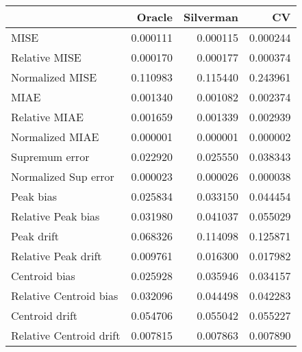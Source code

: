 \begin{tabular}{lrrr}
  \toprule
 & Oracle & Silverman & CV \\ 
  \midrule
MISE & 0.000111 & 0.000115 & 0.000244 \\ 
  Relative MISE & 0.000170 & 0.000177 & 0.000374 \\ 
  Normalized MISE & 0.110983 & 0.115440 & 0.243961 \\ 
  MIAE & 0.001340 & 0.001082 & 0.002374 \\ 
  Relative MIAE & 0.001659 & 0.001339 & 0.002939 \\ 
  Normalized MIAE & 0.000001 & 0.000001 & 0.000002 \\ 
  Supremum error & 0.022920 & 0.025550 & 0.038343 \\ 
  Normalized Sup error & 0.000023 & 0.000026 & 0.000038 \\ 
  Peak bias & 0.025834 & 0.033150 & 0.044454 \\ 
  Relative Peak bias & 0.031980 & 0.041037 & 0.055029 \\ 
  Peak drift & 0.068326 & 0.114098 & 0.125871 \\ 
  Relative Peak drift & 0.009761 & 0.016300 & 0.017982 \\ 
  Centroid bias & 0.025928 & 0.035946 & 0.034157 \\ 
  Relative Centroid bias & 0.032096 & 0.044498 & 0.042283 \\ 
  Centroid drift & 0.054706 & 0.055042 & 0.055227 \\ 
  Relative Centroid drift & 0.007815 & 0.007863 & 0.007890 \\ 
   \bottomrule
\end{tabular}
